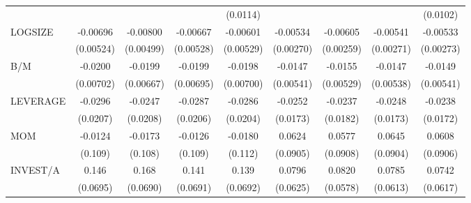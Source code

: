 \begin{table}[htbp]
\begin{tabular}{l*{8}{c}}
                    &                     &                     &                     &    (0.0114)         &                     &                     &                     &    (0.0102)         \\
LOGSIZE             &    -0.00696         &    -0.00800         &    -0.00667         &    -0.00601         &    -0.00534\sym{*}  &    -0.00605\sym{**} &    -0.00541\sym{*}  &    -0.00533\sym{*}  \\
                    &   (0.00524)         &   (0.00499)         &   (0.00528)         &   (0.00529)         &   (0.00270)         &   (0.00259)         &   (0.00271)         &   (0.00273)         \\
B/M                 &     -0.0200\sym{***}&     -0.0199\sym{***}&     -0.0199\sym{***}&     -0.0198\sym{***}&     -0.0147\sym{***}&     -0.0155\sym{***}&     -0.0147\sym{***}&     -0.0149\sym{***}\\
                    &   (0.00702)         &   (0.00667)         &   (0.00695)         &   (0.00700)         &   (0.00541)         &   (0.00529)         &   (0.00538)         &   (0.00541)         \\
LEVERAGE            &     -0.0296         &     -0.0247         &     -0.0287         &     -0.0286         &     -0.0252         &     -0.0237         &     -0.0248         &     -0.0238         \\
                    &    (0.0207)         &    (0.0208)         &    (0.0206)         &    (0.0204)         &    (0.0173)         &    (0.0182)         &    (0.0173)         &    (0.0172)         \\
MOM                 &     -0.0124         &     -0.0173         &     -0.0126         &     -0.0180         &      0.0624         &      0.0577         &      0.0645         &      0.0608         \\
                    &     (0.109)         &     (0.108)         &     (0.109)         &     (0.112)         &    (0.0905)         &    (0.0908)         &    (0.0904)         &    (0.0906)         \\
INVEST/A            &       0.146\sym{**} &       0.168\sym{**} &       0.141\sym{**} &       0.139\sym{**} &      0.0796         &      0.0820         &      0.0785         &      0.0742         \\
                    &    (0.0695)         &    (0.0690)         &    (0.0691)         &    (0.0692)         &    (0.0625)         &    (0.0578)         &    (0.0613)         &    (0.0617)         \\

\end{tabular}
\end{table}
